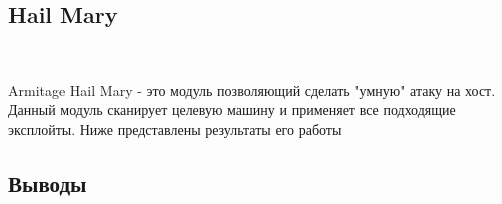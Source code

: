 \documentclass[10pt,a4paper]{article}
\begin{document}
\subsection{ Hail Mary}
~

Armitage Hail Mary - это модуль позволяющий сделать "умную" атаку на хост. Данный модуль сканирует целевую машину и применяет все подходящие эксплойты. Ниже представлены результаты его работы

\subsection{Выводы}
~
\end{document}
